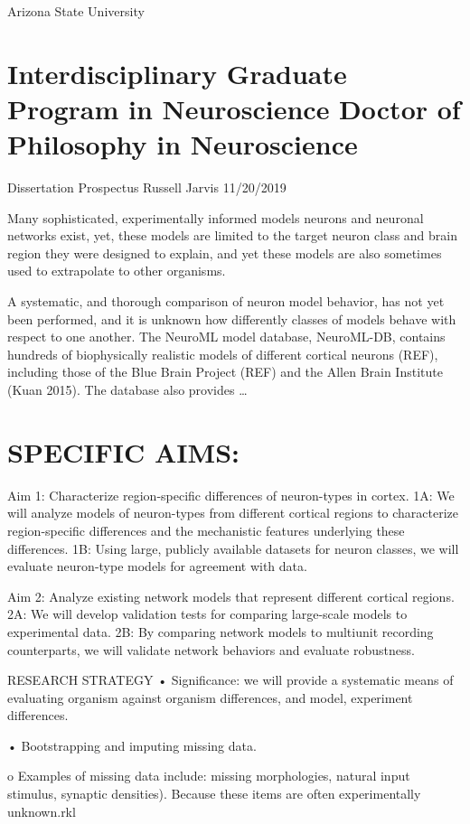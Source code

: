 Arizona State University
\section{Interdisciplinary Graduate Program in Neuroscience Doctor of Philosophy in Neuroscience}

Dissertation Prospectus
Russell Jarvis 
11/20/2019
	




Many sophisticated, experimentally informed models neurons and neuronal networks exist, yet, these models are limited to the target neuron class and brain region they were designed to explain, and yet these models are also sometimes used to extrapolate to other organisms.

A systematic, and thorough comparison of neuron model behavior, has not yet been performed, and it is unknown how differently classes of models behave with respect to one another. The NeuroML model database, NeuroML-DB, contains hundreds of biophysically realistic models of different cortical neurons (REF), including those of the Blue Brain Project (REF) and the Allen Brain Institute (Kuan 2015). The database also provides …


\section{SPECIFIC AIMS:} 

Aim 1: Characterize region-specific differences of neuron-types in cortex.
1A: We will analyze models of neuron-types from different cortical regions to characterize region-specific differences and the mechanistic features underlying these differences. 
1B: Using large, publicly available datasets for neuron classes, we will evaluate neuron-type models for agreement with data.

Aim 2: Analyze existing network models that represent different cortical regions.
2A: We will develop validation tests for comparing large-scale models to experimental data.
2B: By comparing network models to multiunit recording counterparts, we will validate network behaviors and evaluate robustness.

RESEARCH STRATEGY 
•	Significance: we will provide a systematic means of evaluating organism against organism differences, and model, experiment differences.

•	Bootstrapping and imputing missing data.

o	Examples of missing data include: missing morphologies, natural input stimulus, synaptic densities). Because these items are often experimentally unknown.rkl

